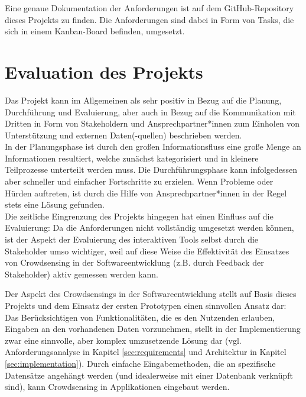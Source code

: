 Eine genaue Dokumentation der Anforderungen ist auf dem GitHub-Repository dieses Projekts zu finden. Die Anforderungen sind dabei in Form von Tasks, die sich in einem Kanban-Board befinden, umgesetzt.

\section{Evaluation des Projekts}
\label{sec:personal_evaluation}
Das Projekt kann im Allgemeinen als sehr positiv in Bezug auf die Planung, Durchführung und Evaluierung, aber auch in Bezug auf die Kommunikation mit Dritten in Form von Stakeholdern und Ansprechpartner*innen zum Einholen von Unterstützung und externen Daten(-quellen) beschrieben werden. \\ In der Planungsphase ist durch den großen Informationsfluss eine große Menge an Informationen resultiert, welche zunächst kategorisiert und in kleinere Teilprozesse unterteilt werden muss. Die Durchführungsphase kann infolgedessen aber schneller und einfacher Fortschritte zu erzielen. Wenn Probleme oder Hürden auftreten, ist durch die Hilfe von Ansprechpartner*innen in der Regel stets eine Lösung gefunden. \\ Die zeitliche Eingrenzung des Projekts hingegen hat einen Einfluss auf die Evaluierung: Da die Anforderungen nicht vollständig umgesetzt werden können, ist der Aspekt der Evaluierung des interaktiven Tools selbst durch die Stakeholder umso wichtiger, weil auf diese Weise die Effektivität des Einsatzes von Crowdsensing in der Softwareentwicklung (z.B. durch Feedback der Stakeholder) aktiv gemessen werden kann.

Der Aspekt des Crowdsensings in der Softwareentwicklung stellt auf Basis dieses Projekts und dem Einsatz der ersten Prototypen einen sinnvollen Ansatz dar: Das Berücksichtigen von Funktionalitäten, die es den Nutzenden erlauben, Eingaben an den vorhandenen Daten vorzunehmen, stellt in der Implementierung zwar eine sinnvolle, aber komplex umzusetzende Lösung dar (vgl. Anforderungsanalyse in Kapitel \ref{sec:requirements} und Architektur in Kapitel \ref{sec:implementation}). Durch einfache Eingabemethoden, die an spezifische Datensätze angehängt werden (und idealerweise mit einer Datenbank verknüpft sind), kann Crowdsensing in Applikationen eingebaut werden.

